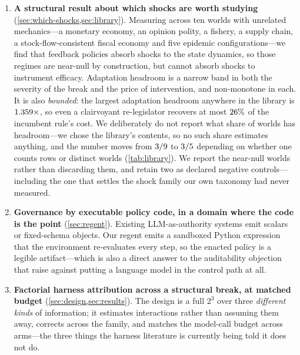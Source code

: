 \documentclass[11pt]{article}
\begin{document}
\begin{enumerate}[leftmargin=1.4em]
\item \textbf{A structural result about which shocks are worth studying}
(\cref{sec:which-shocks,sec:library}). Measuring across ten worlds with unrelated mechanics---a
monetary economy, an opinion polity, a fishery, a supply chain, a stock-flow-consistent fiscal
economy and five epidemic configurations---we find that feedback policies absorb shocks to the state
dynamics, so those regimes are near-null by construction, but cannot absorb shocks to instrument
efficacy. Adaptation headroom is a narrow band in both the severity of the break and the price of
intervention, and non-monotone in each. It is also \emph{bounded}: the largest adaptation headroom
anywhere in the library is $1.359\times$, so even a clairvoyant re-legislator recovers at most
$26\%$ of the incumbent rule's cost. We deliberately do not report what share of worlds
has headroom---we chose the library's contents, so no such share estimates anything, and the number
moves from $3/9$ to $3/5$ depending on whether one counts rows or distinct worlds
(\cref{tab:library}). We report the near-null worlds rather than discarding them, and retain two
as declared negative controls---including the one that settles the shock family our own taxonomy had
never measured.

\item \textbf{Governance by executable policy code, in a domain where the code is the point}
(\cref{sec:regent}). Existing LLM-as-authority systems emit scalars or fixed-schema objects. Our
regent emits a sandboxed Python expression that the environment re-evaluates every step, so the
enacted policy is a legible artifact---which is also a direct answer to the auditability objection
that \citet{zhong2026separating} raise against putting a language model in the control path at all.

\item \textbf{Factorial harness attribution across a structural break, at matched budget}
(\cref{sec:design,sec:results}). The design is a full $2^3$ over three \emph{different kinds} of
information; it estimates interactions rather than assuming them away, corrects across the family,
and matches the model-call budget across arms---the three things the harness literature is currently
being told it does not do.


\end{enumerate}
\end{document}
